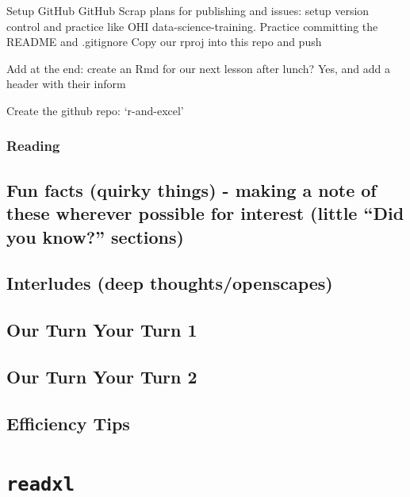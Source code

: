\documentclass[]{book}
\begin{document}
Setup GitHub
GitHub
Scrap plans for publishing and issues: setup version control and practice like OHI data-science-training.
Practice committing the README and .gitignore
Copy our rproj into this repo and push

Add at the end: create an Rmd for our next lesson after lunch? Yes, and add a header with their inform

Create the github repo: `r-and-excel'

\hypertarget{reading}{%
\subsection{Reading}\label{reading}}

\hypertarget{fun-facts-quirky-things---making-a-note-of-these-wherever-possible-for-interest-little-did-you-know-sections-1}{%
\section{Fun facts (quirky things) - making a note of these wherever possible for interest (little ``Did you know?'' sections)}\label{fun-facts-quirky-things---making-a-note-of-these-wherever-possible-for-interest-little-did-you-know-sections-1}}

\hypertarget{interludes-deep-thoughtsopenscapes-2}{%
\section{Interludes (deep thoughts/openscapes)}\label{interludes-deep-thoughtsopenscapes-2}}

\hypertarget{our-turn-your-turn-1}{%
\section{Our Turn Your Turn 1}\label{our-turn-your-turn-1}}

\hypertarget{our-turn-your-turn-2}{%
\section{Our Turn Your Turn 2}\label{our-turn-your-turn-2}}

\hypertarget{efficiency-tips-2}{%
\section{Efficiency Tips}\label{efficiency-tips-2}}

\hypertarget{readxl}{%
\chapter{\texorpdfstring{\texttt{readxl}}{readxl}}\label{readxl}}
\end{document}
